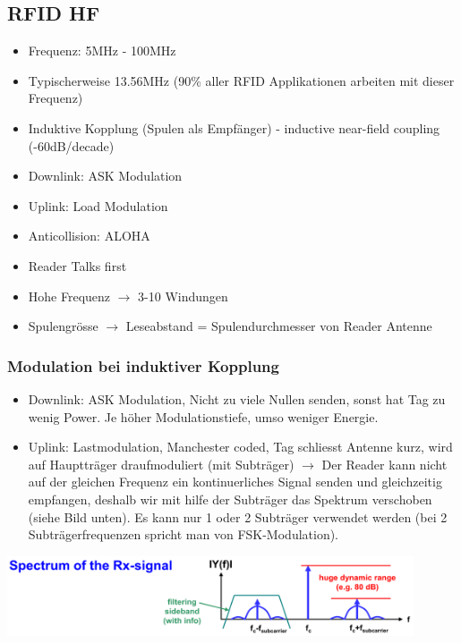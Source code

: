 \subsection{RFID HF}
	\begin{itemize}
		\item Frequenz: 5MHz - 100MHz
		\item Typischerweise 13.56MHz (90\% aller RFID Applikationen arbeiten mit dieser Frequenz)
		\item Induktive Kopplung (Spulen als Empfänger) - inductive near-field coupling (-60dB/decade)
		\item Downlink: ASK Modulation
		\item Uplink: Load Modulation
		\item Anticollision: ALOHA
		\item Reader Talks first
		\item Hohe Frequenz $\rightarrow$ 3-10 Windungen
		\item Spulengrösse $\rightarrow$ Leseabstand = Spulendurchmesser von Reader Antenne
	\end{itemize}
\subsubsection{Modulation bei induktiver Kopplung}
	\begin{itemize}
		\item Downlink: ASK Modulation, Nicht zu viele Nullen senden, sonst hat Tag zu wenig Power. Je höher Modulationstiefe, umso weniger Energie. 
		\item Uplink: Lastmodulation, Manchester coded, Tag schliesst Antenne kurz, wird auf Hauptträger draufmoduliert (mit Subträger) $\rightarrow$
		Der Reader kann nicht auf der gleichen Frequenz ein kontinuerliches Signal senden und gleichzeitig empfangen, deshalb wir mit hilfe der Subträger
		das Spektrum verschoben (siehe Bild unten). Es kann nur 1 oder 2 Subträger verwendet werden (bei 2 Subträgerfrequenzen spricht man von FSK-Modulation).
	\end{itemize}
	
	\begin{minipage}{12cm}
		\begin{center}
			\includegraphics[width=12cm]{./bilder/rfid-spectrum.png} 
		\end{center}
	\end{minipage}
	
